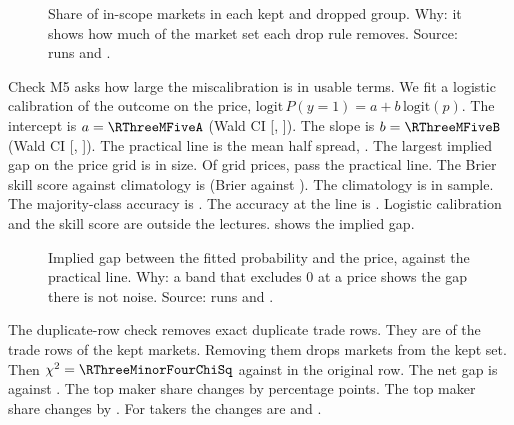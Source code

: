 \begin{figure}[H]
\centering
{}
\caption{Share of in-scope markets in each kept and dropped group. Why: it shows how much of the market set each drop rule removes. Source: runs \RThreeRun{} and \RThreeFigRun.}
\label{fig:r3-m4}
\end{figure}

Check M5 asks how large the miscalibration is in usable terms.
We fit a logistic calibration of the outcome on the price, $\mathrm{logit}\,P(y=1)=a+b\,\mathrm{logit}(p)$.
The intercept is $a=\RThreeMFiveA$ (Wald \CiLevel{} CI [\RThreeMFiveAWaldLow, \RThreeMFiveAWaldHigh]).
The slope is $b=\RThreeMFiveB$ (Wald \CiLevel{} CI [\RThreeMFiveBWaldLow, \RThreeMFiveBWaldHigh]).
The practical line is the mean half spread, \RThreeMOneMeanHalfSpread.
The largest implied gap on the price grid is \RThreeMFiveMaxAbsDelta{} in size.
Of \RThreeMFiveGridPrices{} grid prices, \RThreeMFivePracticalPrices{} pass the practical line.
The Brier skill score against climatology is \RThreeMFiveSkill{} (Brier \RThreeMFiveBrier{} against \RThreeMFiveClimatologyBrier).
The climatology is in sample.
The majority-class accuracy is \RThreeMFiveMajorityAccuracy.
The accuracy at the \FavoriteLine{} line is \RThreeMFiveAccuracyHalf.
Logistic calibration and the skill score are outside the lectures.
 shows the implied gap.

\begin{figure}[H]
\centering
{}
\caption{Implied gap between the fitted probability and the price, against the practical line. Why: a band that excludes 0 at a price shows the gap there is not noise. Source: runs \RThreeRun{} and \RThreeFigRun.}
\label{fig:r3-m5}
\end{figure}

The duplicate-row check removes exact duplicate trade rows.
They are \RThreeMinorFourDupShare{} of the trade rows of the kept markets.
Removing them drops \RThreeMinorFourRemoved{} markets from the kept set.
Then $\chi^2=\RThreeMinorFourChiSq$ against \QOneChiSq{} in the original row.
The net gap is \RThreeMinorFourNetGap{} against \GapNetDiffMain.
The top \TopOneLabel{} maker share changes by \RThreeMinorFourMakerTopOneDeltaPp{} percentage points.
The top \TopTwentyLabel{} maker share changes by \RThreeMinorFourMakerTopTwentyDeltaPp.
For takers the changes are \RThreeMinorFourTakerTopOneDeltaPp{} and \RThreeMinorFourTakerTopTwentyDeltaPp.

